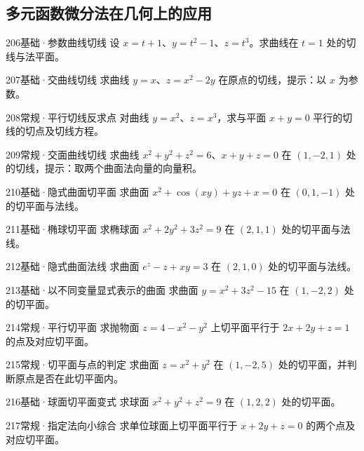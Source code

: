 \subsection{多元函数微分法在几何上的应用}
\begin{exercise}{206}{基础·参数曲线切线}
设 $x=t+1$、$y=t^2-1$、$z=t^3$。求曲线在 $t=1$ 处的切线与法平面。
\end{exercise}
\begin{exercise}{207}{基础·交曲线切线}
求曲线 $y=x$、$z=x^2-2y$ 在原点的切线，提示：以 $x$ 为参数。
\end{exercise}
\begin{exercise}{208}{常规·平行切线反求点}
对曲线 $y=x^2$、$z=x^3$，求与平面 $x+y=0$ 平行的切线的切点及切线方程。
\end{exercise}
\begin{exercise}{209}{常规·交面曲线切线}
求曲线 $x^2+y^2+z^2=6$、$x+y+z=0$ 在 $(1,-2,1)$ 处的切线，提示：取两个曲面法向量的向量积。
\end{exercise}
\begin{exercise}{210}{基础·隐式曲面切平面}
求曲面 $x^2+\cos(xy)+yz+x=0$ 在 $(0,1,-1)$ 处的切平面与法线。
\end{exercise}
\begin{exercise}{211}{基础·椭球切平面}
求椭球面 $x^2+2y^2+3z^2=9$ 在 $(2,1,1)$ 处的切平面与法线。
\end{exercise}
\begin{exercise}{212}{基础·隐式曲面法线}
求曲面 $e^z-z+xy=3$ 在 $(2,1,0)$ 处的切平面与法线。
\end{exercise}
\begin{exercise}{213}{基础·以不同变量显式表示的曲面}
求曲面 $y=x^2+3z^2-15$ 在 $(1,-2,2)$ 处的切平面。
\end{exercise}
\begin{exercise}{214}{常规·平行切平面}
求抛物面 $z=4-x^2-y^2$ 上切平面平行于 $2x+2y+z=1$ 的点及对应切平面。
\end{exercise}
\begin{exercise}{215}{常规·切平面与点的判定}
求曲面 $z=x^2+y^2$ 在 $(1,-2,5)$ 处的切平面，并判断原点是否在此切平面内。
\end{exercise}
\begin{exercise}{216}{基础·球面切平面变式}
求球面 $x^2+y^2+z^2=9$ 在 $(1,2,2)$ 处的切平面。
\end{exercise}
\begin{exercise}{217}{常规·指定法向小综合}
求单位球面上切平面平行于 $x+2y+z=0$ 的两个点及对应切平面。
\end{exercise}
